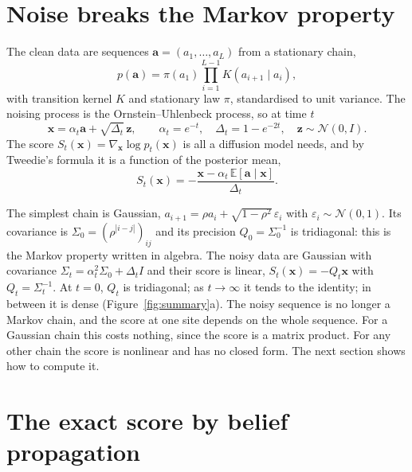 \documentclass[11pt,a4paper]{article}
\newcommand{\E}{\mathbb{E}}
\newcommand{\N}{\mathcal{N}}
\newcommand{\va}{\mathbf{a}}
\newcommand{\vx}{\mathbf{x}}
\newcommand{\vz}{\mathbf{z}}
\begin{document}
\section{Noise breaks the Markov property}
\label{sec:setting}

The clean data are sequences $\va=(a_1,\dots,a_L)$ from a stationary chain,
\[
p(\va)=\pi(a_1)\prod_{i=1}^{L-1}K(a_{i+1}\mid a_i),
\]
with transition kernel $K$ and stationary law $\pi$, standardised to unit variance. The noising process is the
Ornstein--Uhlenbeck process, so at time $t$
\[
\vx=\alpha_t\va+\sqrt{\Delta_t}\,\vz,\qquad \alpha_t=e^{-t},\quad \Delta_t=1-e^{-2t},\quad \vz\sim\N(0,I).
\]
The score $S_t(\vx)=\nabla_\vx\log p_t(\vx)$ is all a diffusion model needs, and by Tweedie's formula
\citep{robbins1956empirical,efron2011tweedie} it is a function of the posterior mean,
\begin{equation}
S_t(\vx)=-\frac{\vx-\alpha_t\,\E[\va\mid\vx]}{\Delta_t}.
\label{eq:tweedie}
\end{equation}

The simplest chain is Gaussian, $a_{i+1}=\rho a_i+\sqrt{1-\rho^2}\,\varepsilon_i$ with $\varepsilon_i\sim\N(0,1)$. Its
covariance is $\Sigma_0=(\rho^{|i-j|})_{ij}$ and its precision $Q_0=\Sigma_0^{-1}$ is tridiagonal: this is the Markov
property written in algebra. The noisy data are Gaussian with covariance $\Sigma_t=\alpha_t^2\Sigma_0+\Delta_tI$ and their
score is linear, $S_t(\vx)=-Q_t\vx$ with $Q_t=\Sigma_t^{-1}$. At $t=0$, $Q_t$ is tridiagonal; as $t\to\infty$ it tends to the
identity; in between it is dense (Figure~\ref{fig:summary}a). The noisy sequence is no longer a Markov chain, and the score at
one site depends on the whole sequence. For a Gaussian chain this costs nothing, since the score is a matrix product. For any
other chain the score is nonlinear and has no closed form. The next section shows how to compute it.

\section{The exact score by belief propagation}
\label{sec:bp}
\end{document}
